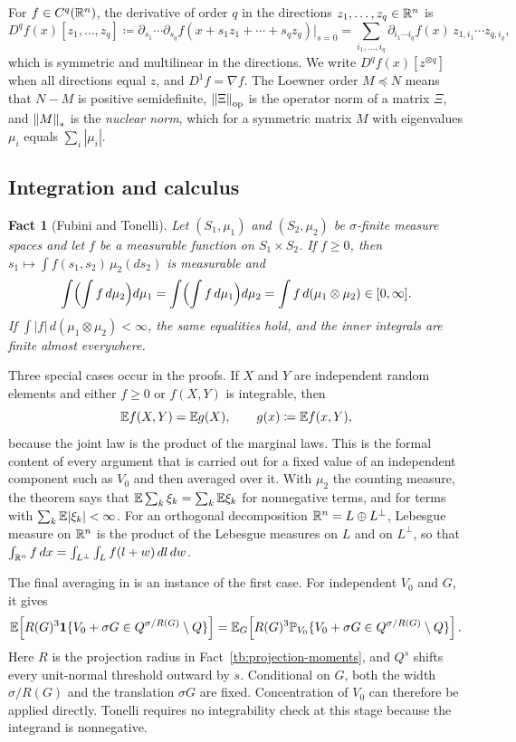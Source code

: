 \documentclass[11pt,letterpaper]{article}
\theoremstyle{plain}
\newtheorem{fact}{Fact}[section]
\begin{document}
For \(f\in C^q(\mathbb R^n)\), the derivative of order \(q\) in the directions
\(z_1,\ldots,z_q\in\mathbb R^n\) is
\[
 D^qf(x)[z_1,\ldots,z_q]
 \coloneqq \partial_{s_1}\cdots\partial_{s_q}f(x+s_1z_1+\cdots+s_qz_q)\Big|_{s=0}
 =\sum_{i_1,\ldots,i_q}\partial_{i_1\cdots i_q}f(x)\,
   z_{1,i_1}\cdots z_{q,i_q},
\]
which is symmetric and multilinear in the directions. We write
\(D^qf(x)[z^{\otimes q}]\) when all directions equal \(z\), and
\(D^1f=\nabla f\). The Loewner order \(M\preceq N\) means that
\(N-M\) is positive semidefinite, \(\left\lVert\Xi\right\rVert_{\mathrm{op}}\) is the operator norm
of a matrix \(\Xi\), and \(\left\lVert M\right\rVert_*\) is the \emph{nuclear norm}, which for
a symmetric matrix \(M\) with eigenvalues \(\mu_i\) equals \(\sum_i|\mu_i|\).

\subsection{Integration and calculus}\label{tb:sec:calc}

\begin{fact}[Fubini and Tonelli]\label{tb:fubini}
Let \((S_1,\mu_1)\) and \((S_2,\mu_2)\) be \(\sigma\)-finite measure
spaces and let \(f\) be a measurable function on \(S_1\times S_2\). If
\(f\ge0\), then \(s_1\mapsto\int f(s_1,s_2)\,\mu_2(ds_2)\) is measurable
and
\[
 \int\Bigl(\int f\,d\mu_2\Bigr)d\mu_1
 =\int\Bigl(\int f\,d\mu_1\Bigr)d\mu_2
 =\int f\,d(\mu_1\otimes\mu_2)\in[0,\infty].
\]
If \(\int|f|\,d(\mu_1\otimes\mu_2)<\infty\), the same equalities hold, and
the inner integrals are finite almost everywhere.
\end{fact}

Three special cases occur in the proofs. If \(X\) and \(Y\) are
independent random elements and either \(f\ge0\) or \(f(X,Y)\) is
integrable, then
\[
 \mathbb E f(X,Y)=\mathbb E g(X),\qquad g(x)\coloneqq \mathbb E f(x,Y),
\]
because the joint law is the product of the marginal laws. This is the
formal content of every argument that is carried out for a fixed value of
an independent component such as \(V_0\) and then averaged over it. With
\(\mu_2\) the counting measure, the theorem says that
\(\mathbb E\sum_k\xi_k=\sum_k\mathbb E\xi_k\) for nonnegative terms, and for terms with
\(\sum_k\mathbb E|\xi_k|<\infty\). For an orthogonal decomposition
\(\mathbb R^n=L\oplus L^\perp\), Lebesgue measure on \(\mathbb R^n\) is the product of the
Lebesgue measures on \(L\) and on \(L^\perp\), so that
\(\int_{\mathbb R^n}f\,dx=\int_{L^\perp}\int_Lf(l+w)\,dl\,dw\).

The final averaging in  is an
instance of the first case. For independent \(V_0\) and \(G\), it gives
\[
 \mathbb E\!\left[R(G)^3\mathbf 1\{V_0+\sigma G\in
                   Q^{\sigma/R(G)}\setminus Q\}\right]
 =\mathbb E_G\!\left[R(G)^3\mathbb P_{V_0}\{V_0+\sigma G\in
                   Q^{\sigma/R(G)}\setminus Q\}\right].
\]
Here \(R\) is the projection radius in
Fact~\ref{tb:projection-moments}, and \(Q^s\) shifts every
unit-normal threshold outward by \(s\). Conditional on \(G\), both
the width \(\sigma/R(G)\) and the translation \(\sigma G\) are fixed.
Concentration of \(V_0\) can therefore be applied directly. Tonelli
requires no integrability check at this stage because the integrand
is nonnegative.
\end{document}
